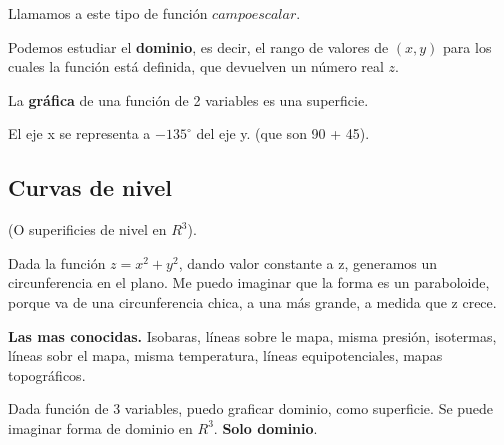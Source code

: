 Llamamos a este tipo de función \(campo escalar\).

Podemos estudiar el \textbf{dominio},
es decir, 
el rango de valores de \((x,y)\) para los cuales la función está definida,
que devuelven un número real \(z\).

La \textbf{gráfica} de una función de 2 variables
es una superficie.

El eje x se representa a \(-135^{\circ}\) del eje y.
(que son 90 + 45).

\subsection{Curvas de nivel}

(O superificies de nivel en \(R^{3}\)).

Dada la función \(z=x^{2}+y^{2}\),
dando valor constante a z,
generamos un circunferencia en el plano.
Me puedo imaginar que la forma es un paraboloide,
porque va de una circunferencia chica,
a una más grande,
a medida que z crece.

\textbf{Las mas conocidas.}
Isobaras, líneas sobre le mapa, misma presión,
isotermas, líneas sobr el mapa, misma temperatura,
líneas equipotenciales,
mapas topográficos.

Dada función de 3 variables,
puedo graficar dominio,
como superficie.
Se puede imaginar forma de dominio en \(R^{3}\).
\textbf{Solo dominio}.
